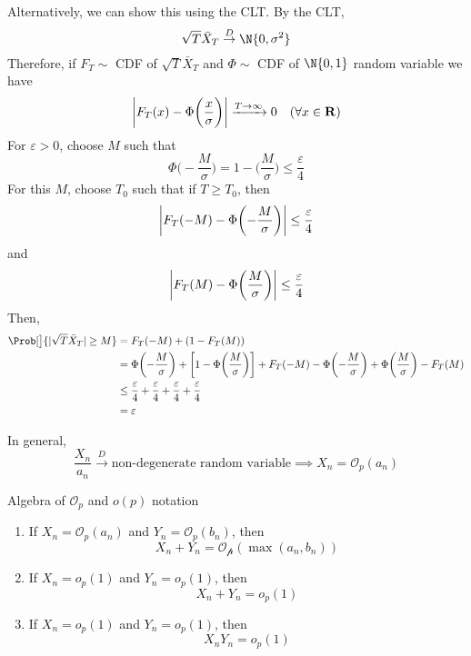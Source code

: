 \begin{Remark}{}{}
    Alternatively, we can show this using the CLT\@. By the CLT,
    \[ \sqrt{T}\bar{X}_T\stackrel{D}{\to}\N{0,\sigma^2} \]
    Therefore, if $ F_T\sim $ CDF of $ \sqrt{T}\bar{X}_T $ and $ \Phi\sim $
    CDF of $ \N{0,1} $ random variable we have
    \[ \abs*{F_T(x)-\Phi\biggl(\frac{x}{\sigma}\biggr)}\xrightarrow{T\to\infty}0\quad (\forall x\in\mathbf{R}) \]
    For $ \varepsilon>0 $, choose $ M $ such that
    \[ \Phi\biggl(-\frac{M}{\sigma}\biggr)=1-\biggl(\frac{M}{\sigma}\biggr)\le \frac{\varepsilon}{4} \]
    For this $ M $, choose $ T_0 $ such that if $ T\ge T_0 $, then
    \[ \abs*{F_T(-M)-\Phi\biggl(-\frac{M}{\sigma}\biggr)}\le \frac{\varepsilon}{4} \]
    and
    \[ \abs*{F_T(M)-\Phi\biggl(\frac{M}{\sigma}\biggr)}\le \frac{\varepsilon}{4} \]
    Then,
    \begin{align*}
        \Prob[\big]{\abs{\sqrt{T}\bar{X}_T}\ge M}
         & =F_T(-M)+(1-F_T(M))                                                                                                                                                            \\
         & =\Phi\biggl(-\frac{M}{\sigma}\biggr)+\biggl[1-\Phi\biggl(\frac{M}{\sigma} \biggr)\biggr]+F_T(-M)-\Phi\biggl(-\frac{M}{\sigma}\biggr)+\Phi\biggl(\frac{M}{\sigma}\biggr)-F_T(M) \\
         & \le \frac{\varepsilon}{4}+\frac{\varepsilon}{4} + \frac{\varepsilon}{4} + \frac{\varepsilon}{4}                                                                                \\
         & = \varepsilon
    \end{align*}
\end{Remark}
\begin{Remark}{}{}
    In general,
    \[ \frac{X_n}{a_n}\stackrel{D}{\to}\text{non-degenerate random variable}\implies X_n=\mathcal{O}_p(a_n)  \]
\end{Remark}
\begin{Remark}{Algebra of $ \mathcal{O}_p $ and $ o(p) $ notation}{}
    \begin{enumerate}
        \item If $ X_n=\mathcal{O}_p(a_n) $ and $ Y_n=\mathcal{O}_p(b_n) $, then
              \[ X_n+Y_n=\mathcal{O_p}(\max(a_n,b_n)) \]
        \item If $ X_n=o_p(1) $ and $ Y_n=o_p(1) $, then
              \[ X_n+Y_n=o_p(1) \]
        \item If $ X_n=o_p(1) $ and $ Y_n=o_p(1) $, then
              \[ X_n Y_n=o_p(1) \]
    \end{enumerate}
\end{Remark}
